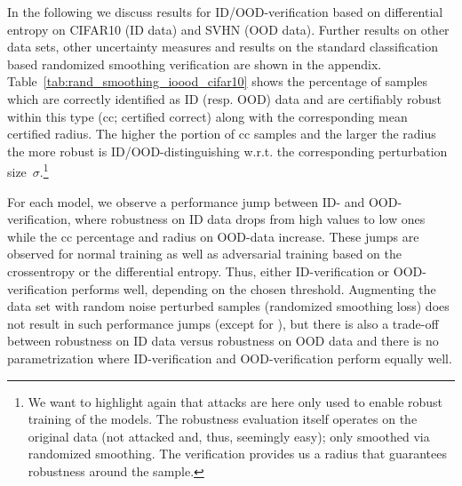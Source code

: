 In the following we discuss results for ID/OOD-verification based on differential entropy on CIFAR10 (ID data) and SVHN (OOD data). Further  results on other data sets, other uncertainty measures and results on the standard classification based randomized smoothing verification are shown in the appendix. 
%
Table~\ref{tab:rand_smoothing_ioood_cifar10} shows the percentage of samples which are correctly identified as ID (resp. OOD) data and are certifiably robust within this type (cc; certified correct) 
along with the corresponding mean certified radius. The higher the portion of cc samples and the larger the radius the more robust is ID/OOD-distinguishing w.r.t. the corresponding perturbation size~$\sigma$.\footnote{We want to highlight again that attacks are here only used to enable robust training of the models. The robustness evaluation itself operates on the original data (not attacked and, thus, seemingly easy); only smoothed via randomized smoothing. The verification  provides us a radius that guarantees robustness around the sample.}  




For each model, we observe a performance jump between ID- and OOD-verification, where robustness on ID data drops from high values to low ones while the cc percentage and radius on OOD-data increase. These jumps are observed for normal training as well as adversarial training based on the crossentropy or the differential entropy. Thus, either ID-verification or OOD-verification performs well, depending on the chosen threshold. 
Augmenting the data set with random noise perturbed samples (randomized smoothing loss) does not result in such performance jumps (except for \PriorNet), but there is also a trade-off between robustness on ID data versus robustness on OOD data and there is no parametrization where ID-verification and OOD-verification perform equally well. 





